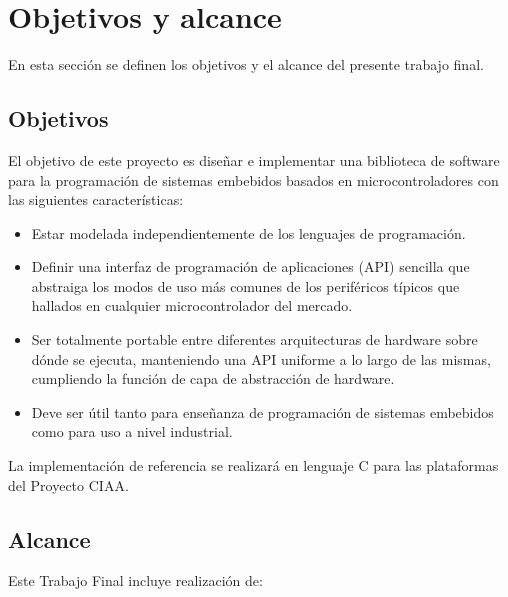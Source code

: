 \section{Objetivos y alcance}
\label{sec:objetivosAlance}

En esta sección se definen los objetivos y el alcance del presente trabajo final.

\subsection{Objetivos}
\label{subsec:objetivos}

El objetivo de este proyecto es diseñar e implementar una biblioteca de software para la programación de sistemas embebidos basados en microcontroladores con las siguientes características: 

\begin{itemize}
\item
Estar modelada independientemente de los lenguajes de programación.
\item
Definir una interfaz de programación de aplicaciones (API) sencilla que abstraiga los modos de uso más comunes de los periféricos típicos que hallados en cualquier microcontrolador del mercado. 
\item
Ser totalmente portable entre diferentes arquitecturas de hardware sobre dónde se ejecuta, manteniendo una API uniforme a lo largo de las mismas, cumpliendo la función de capa de abstracción de hardware.
\item
Deve ser útil tanto para enseñanza de programación de sistemas embebidos como para uso a nivel industrial.
\end{itemize}

La implementación de referencia se realizará en lenguaje C para las plataformas del Proyecto CIAA.

\subsection{Alcance}
\label{subsec:alcance}

Este Trabajo Final incluye realización de:

